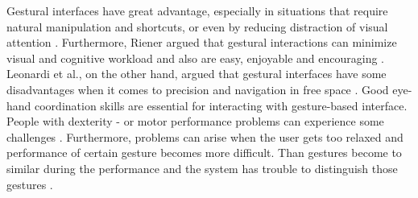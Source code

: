 \newline
Gestural interfaces have great advantage, especially in situations that require natural manipulation and shortcuts, or even by reducing distraction of visual attention \cite{ParkWonkyu2014}. Furthermore, Riener argued that gestural interactions can minimize visual and cognitive workload and also are easy, enjoyable and encouraging \cite{Riener2012}. Leonardi et al., on the other hand, argued that gestural interfaces have some disadvantages when it comes to precision and navigation in free space \cite{Leonardi2010}. Good eye-hand coordination skills are essential for interacting with gesture-based interface. People with dexterity - or motor performance problems can experience some challenges \cite{Ni2011, Siek2005}. Furthermore, problems can arise when the user gets too relaxed and performance of certain gesture becomes more difficult. Than gestures become to similar during the performance and the system has trouble to distinguish those gestures \cite{Freeman2012}.
\newline

